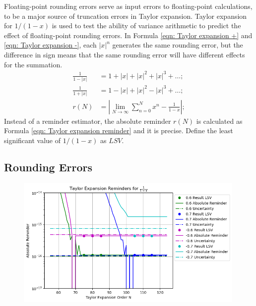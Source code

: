 \documentclass[twoside]{article}
\numberwithin{equation}{section}
\begin{document}
Floating-point rounding errors serve as input errors to floating-point calculations, to be a major source of truncation errors in Taylor expansion.
Taylor expansion for $1/(1-x)$ is used to test the ability of variance arithmetic to predict the effect of floating-point rounding errors.
In Formula \eqref{eqn: Taylor expansion +} and \eqref{eqn: Taylor expansion -}, each $|x|^n$ generates the same rounding error, but the difference in sign means that the same rounding error will have different effects for the summation. 
\begin{align}
\label{eqn: Taylor expansion +}
\frac{1}{1 - |x|} &= 1 + |x| + |x|^2 + |x|^3 + \dots; \\
\label{eqn: Taylor expansion -}
\frac{1}{1 + |x|} &= 1 - |x| + |x|^2 - |x|^3 + \dots; \\
\label{eqn: Taylor expansion reminder}
r(N) & = \left| \lim_{N \rightarrow \infty} \sum_{n = 0}^{N} x^n - \frac{1}{1-x} \right|;
\end{align}
Instead of a reminder estimator, the absolute reminder $r(N)$ is calculated as Formula \eqref{eqn: Taylor expansion reminder} and it is precise.
Define the least significant value of $1/(1-x)$ as $LSV$.


\subsection{Rounding Errors}

\begin{figure}[p]
\centering
\includegraphics[height=2.5in]{Taylor_Expansion_Uncertainty.png} 
\label{fig: Taylor_Expansion_Uncertainty}
\end{figure}
\end{document}
